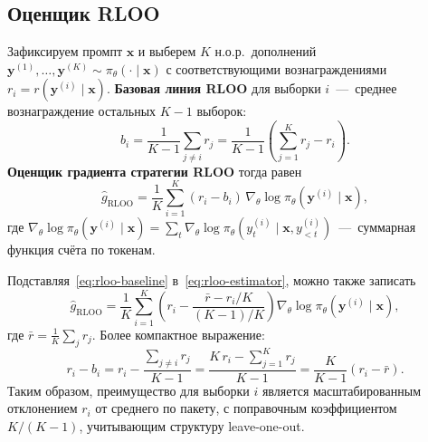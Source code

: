 \subsection{Оценщик RLOO}


Зафиксируем промпт $\mathbf{x}$ и выберем $K$ н.о.р.\ дополнений $\mathbf{y}^{(1)}, \ldots, \mathbf{y}^{(K)} \sim \pi_\theta(\cdot \mid \mathbf{x})$ с соответствующими вознаграждениями $r_i = r(\mathbf{y}^{(i)} \mid \mathbf{x})$. \textbf{Базовая линия RLOO} для выборки $i$ \,---\, среднее вознаграждение остальных $K-1$ выборок:
\begin{equation}
\label{eq:rloo-baseline}
b_i = \frac{1}{K-1} \sum_{j \neq i} r_j = \frac{1}{K-1}\left(\sum_{j=1}^K r_j - r_i\right).
\end{equation}
\textbf{Оценщик градиента стратегии RLOO} тогда равен
\begin{equation}
\label{eq:rloo-estimator}
\hat g_{\text{RLOO}} = \frac{1}{K} \sum_{i=1}^K (r_i - b_i)\, \nabla_\theta \log \pi_\theta(\mathbf{y}^{(i)} \mid \mathbf{x}),
\end{equation}
где $\nabla_\theta \log \pi_\theta(\mathbf{y}^{(i)} \mid \mathbf{x}) = \sum_{t} \nabla_\theta \log \pi_\theta(y^{(i)}_t \mid \mathbf{x}, y^{(i)}_{<t})$ \,---\, суммарная функция счёта по токенам.

Подставляя~\eqref{eq:rloo-baseline} в~\eqref{eq:rloo-estimator}, можно также записать
\begin{equation}
\label{eq:rloo-expanded}
\hat g_{\text{RLOO}} = \frac{1}{K} \sum_{i=1}^K \left(r_i - \frac{\bar r - r_i / K}{(K-1)/K}\right) \nabla_\theta \log \pi_\theta(\mathbf{y}^{(i)} \mid \mathbf{x}),
\end{equation}
где $\bar r = \frac{1}{K}\sum_j r_j$. Более компактное выражение:
\begin{equation}
\label{eq:rloo-clean}
r_i - b_i = r_i - \frac{\sum_{j \neq i} r_j}{K-1} = \frac{K\, r_i - \sum_{j=1}^K r_j}{K-1} = \frac{K}{K-1}\!\left(r_i - \bar r\right).
\end{equation}
Таким образом, преимущество для выборки $i$ является масштабированным отклонением $r_i$ от среднего по пакету, с поправочным коэффициентом $K/(K-1)$, учитывающим структуру leave-one-out.


